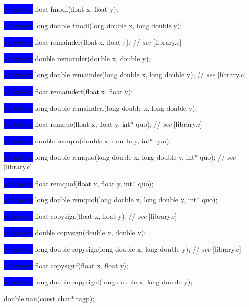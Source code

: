 \documentclass[prd,twocolumn,amsmath,amssymb,nofootinbib,eqsecnum]{revtex4-1}
\newcommand{\oldhighlight}[1]{\colorbox{blue}{\!\!\!\! #1}}
\newcommand{\stdcomment}[1]{{// {\it see} [#1]}}
\begin{document}
{\oldhighlight{constexpr} float fmodf(float x, float y);

\oldhighlight{constexpr} long double fmodl(long double x, long double y);

\vspace{2ex}


\oldhighlight{constexpr} float remainder(float x, float y); \stdcomment{library.c}

\oldhighlight{constexpr} double remainder(double x, double y);

\oldhighlight{constexpr} long double remainder(long double x, long double y); \stdcomment{library.c}

\oldhighlight{constexpr} float remainderf(float x, float y);

\oldhighlight{constexpr} long double remainderl(long double x, long double y);

\vspace{2ex}


\oldhighlight{constexpr}  float remquo(float x, float y, int* quo); \stdcomment{library.c}

\oldhighlight{constexpr}  double remquo(double x, double y, int* quo);

\oldhighlight{constexpr}  long double remquo(long double x, long double y, int* quo); \stdcomment{library.c}

\oldhighlight{constexpr}  float remquof(float x, float y, int* quo);

\oldhighlight{constexpr}  long double remquol(long double x, long double y, int* quo);

\vspace{2ex}


\oldhighlight{constexpr} float copysign(float x, float y); \stdcomment{library.c}

\oldhighlight{constexpr} double copysign(double x, double y);

\oldhighlight{constexpr} long double copysign(long double x, long double y); \stdcomment{library.c}

\oldhighlight{constexpr} float copysignf(float x, float y);

\oldhighlight{constexpr} long double copysignl(long double x, long double y);

\vspace{2ex}

double nan(const char* tagp);

}
\end{document}
